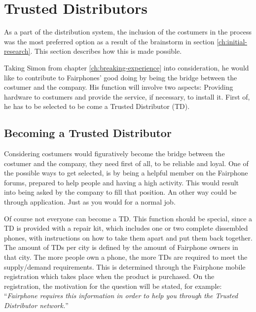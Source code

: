 \documentclass[final]{scrreprt} %
\begin{document}
\chapter{Trusted Distributors} %
\label{ch:trusted-distributors}
As a part of the distribution system, the inclusion of the costumers in the process was the most preferred option as a result of the brainstorm in section \ref{ch:initial-research}. This section describes how this is made possible.

Taking Simon from chapter \ref{ch:breaking-experience} into consideration, he would like to contribute to Fairphones' good doing by being the bridge between the costumer and the company. His function will involve two aspects: Providing hardware to costumers and provide the service, if necessary, to install it. First of, he has to be selected to be come a Trusted Distributor (TD).

\section{Becoming a Trusted Distributor}
Considering costumers would figuratively become the bridge between the costumer and the company, they need first of all, to be reliable and loyal. One of the possible ways to get selected, is by being a helpful member on the Fairphone forums, prepared to help people and having a high activity. This would result into being asked by the company to fill that position. An other way could be through application. Just as you would for a normal job. 

Of course not everyone can become a TD. This function should be special, since a TD is provided with a repair kit, which includes one or two complete dissembled phones, with instructions on how to take them apart and put them back together. The amount of TDs per city is defined by the amount of Fairphone owners in that city. The more people own a phone, the more TDs are required to meet the supply/demand requirements. This is determined through the Fairphone mobile registration which takes place when the product is purchased. On the registration, the motivation for the question will be stated, for example: ``\textit{Fairphone requires this information in order to help you through the Trusted Distributor network.}''  

\end{document}
